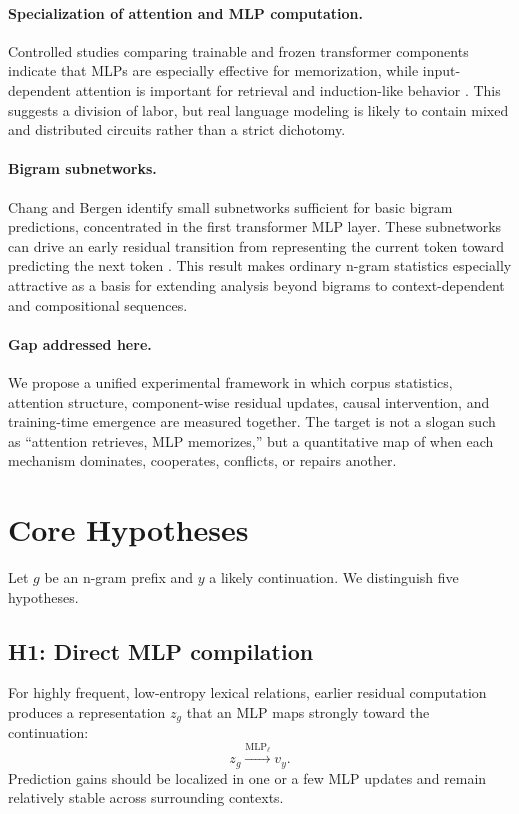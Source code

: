 \documentclass[10pt]{article}
\begin{document}
\paragraph{Specialization of attention and MLP computation.}
Controlled studies comparing trainable and frozen transformer components indicate that MLPs are especially effective for memorization, while input-dependent attention is important for retrieval and induction-like behavior \cite{dong2025attention}. This suggests a division of labor, but real language modeling is likely to contain mixed and distributed circuits rather than a strict dichotomy.

\paragraph{Bigram subnetworks.}
Chang and Bergen identify small subnetworks sufficient for basic bigram predictions, concentrated in the first transformer MLP layer. These subnetworks can drive an early residual transition from representing the current token toward predicting the next token \cite{chang2025bigram}. This result makes ordinary n-gram statistics especially attractive as a basis for extending analysis beyond bigrams to context-dependent and compositional sequences.

\paragraph{Gap addressed here.}
We propose a unified experimental framework in which corpus statistics, attention structure, component-wise residual updates, causal intervention, and training-time emergence are measured together. The target is not a slogan such as ``attention retrieves, MLP memorizes,'' but a quantitative map of when each mechanism dominates, cooperates, conflicts, or repairs another.

\section{Core Hypotheses}
Let $g$ be an n-gram prefix and $y$ a likely continuation. We distinguish five hypotheses.

\subsection{H1: Direct MLP compilation}
For highly frequent, low-entropy lexical relations, earlier residual computation produces a representation $z_g$ that an MLP maps strongly toward the continuation:
\begin{equation}
 z_g \xrightarrow{\mathrm{MLP}_\ell} v_y.
\end{equation}
Prediction gains should be localized in one or a few MLP updates and remain relatively stable across surrounding contexts.
\end{document}
